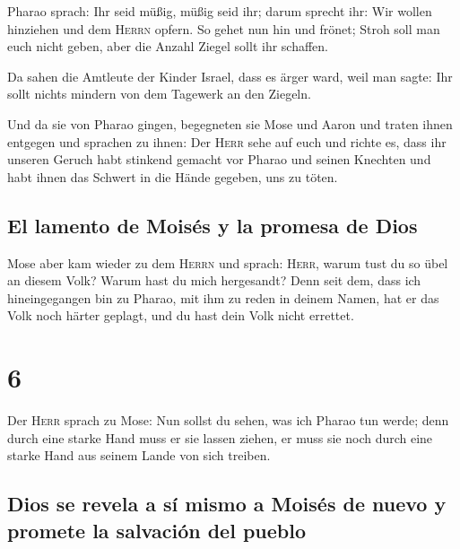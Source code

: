  Pharao sprach: Ihr seid müßig, müßig seid ihr; darum
sprecht ihr: Wir wollen hinziehen und dem \textsc{Herrn} opfern.
 So gehet nun hin und frönet; Stroh soll man euch nicht
geben, aber die Anzahl Ziegel sollt ihr schaffen.

 Da sahen die Amtleute der Kinder Israel, dass es ärger
ward, weil man sagte: Ihr sollt nichts mindern von dem Tagewerk an den
Ziegeln.

 Und da sie von Pharao gingen, begegneten sie Mose und
Aaron und traten ihnen entgegen  und sprachen zu ihnen:
Der \textsc{Herr} sehe auf euch und richte es, dass ihr unseren Geruch
habt stinkend gemacht vor Pharao und seinen Knechten und habt ihnen das
Schwert in die Hände gegeben, uns zu töten.

\hypertarget{el-lamento-de-moisuxe9s-y-la-promesa-de-dios}{%
\subsection{El lamento de Moisés y la promesa de
Dios}\label{el-lamento-de-moisuxe9s-y-la-promesa-de-dios}}

 Mose aber kam wieder zu dem \textsc{Herrn} und sprach:
\textsc{Herr}, warum tust du so übel an diesem Volk? Warum hast du mich
hergesandt?  Denn seit dem, dass ich hineingegangen bin
zu Pharao, mit ihm zu reden in deinem Namen, hat er das Volk noch härter
geplagt, und du hast dein Volk nicht errettet.

\hypertarget{section-5}{%
\section{6}\label{section-5}}

 Der \textsc{Herr} sprach zu Mose: Nun sollst du sehen,
was ich Pharao tun werde; denn durch eine starke Hand muss er sie lassen
ziehen, er muss sie noch durch eine starke Hand aus seinem Lande von
sich treiben.

\hypertarget{dios-se-revela-a-suxed-mismo-a-moisuxe9s-de-nuevo-y-promete-la-salvaciuxf3n-del-pueblo}{%
\subsection{Dios se revela a sí mismo a Moisés de nuevo y promete la
salvación del
pueblo}\label{dios-se-revela-a-suxed-mismo-a-moisuxe9s-de-nuevo-y-promete-la-salvaciuxf3n-del-pueblo}}

